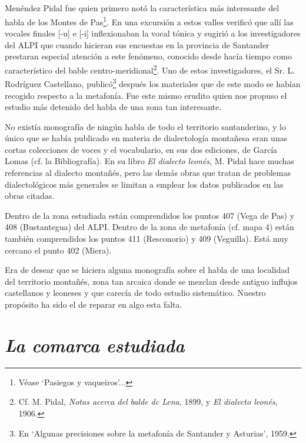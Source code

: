 \documentclass[11pt,spanish,b5paper]{book}
\begin{document}
\subsection{} Menéndez Pidal fue quien primero notó la característica más interesante del habla de los Montes de Pas\footnote{Véase `Pasiegos y vaqueiros'...}. En una excursión a estos valles verificó que allí las vocales finales [-u] e [-i] inflexionaban la vocal tónica y sugirió a los investigadores del ALPI que cuando hicieran sus encuestas en la provincia de Santander prestaran especial atención a este fenómeno, conocido desde hacía tiempo como característico del bable centro-meridional\footnote{Cf. M. Pidal, \emph{Notas acerca del balde dc Lena}, 1899, y \emph{El dialecto leonés}, 1906.}. Uno de estos investigadores, el Sr. L. Rodríguez Castellano, publicó\footnote{En `Algunas precisiones sobre la metafonía de Santander y Asturias', 1959.} después los materiales que de este modo se habían recogido respecto a la metafonía. Fue este mismo erudito quien nos propuso el estudio más detenido del habla de una zona tan interesante.

No existía monografía de ningún habla de todo el territorio santanderino, y lo único que se había publicado en materia de dialectología montañesa eran unas cortas colecciones de voces y el vocabulario, en sus dos ediciones, de García Lomas (cf. la Bibliografía). En su libro \emph{El dialecto leonés}, M. Pidal hace muchas referencias al dialecto montañés, pero las demás obras que tratan de problemas dialectológicos más generales se limitan a emplear los datos publicados en las obras citadas. 

Dentro de la zona estudiada están comprendidos los puntos 407 (Vega de Pas) y 408 (Bustantegua) del ALPI. Dentro de la zona de metafonía (cf. mapa 4) están también comprendidos los puntos 411 (Resconorio) y 409 (Veguilla). Está muy cercano el punto 402 (Miera). 

Era de desear que se hiciera alguna monografía sobre el habla de una localidad del territorio montañés, zona tan arcaica donde se mezclan desde antiguo influjos castellanos y leoneses y que carecía de todo estudio sistemático. Nuestro propósito ha sido el de reparar en algo esta falta. 

\section{\emph{La comarca estudiada}}
\end{document}
